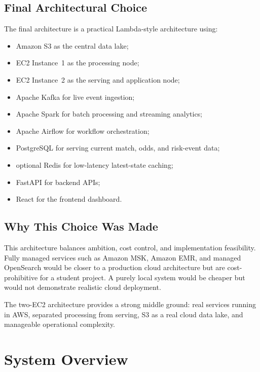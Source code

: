 \documentclass[11pt,a4paper]{article}
\begin{document}
\subsection{Final Architectural Choice}

The final architecture is a practical Lambda-style architecture using:

\begin{itemize}[nosep]
  \item Amazon S3 as the central data lake;
  \item EC2 Instance~1 as the processing node;
  \item EC2 Instance~2 as the serving and application node;
  \item Apache Kafka for live event ingestion;
  \item Apache Spark for batch processing and streaming analytics;
  \item Apache Airflow for workflow orchestration;
  \item PostgreSQL for serving current match, odds, and risk-event data;
  \item optional Redis for low-latency latest-state caching;
  \item FastAPI for backend APIs;
  \item React for the frontend dashboard.
\end{itemize}

\subsection{Why This Choice Was Made}

This architecture balances ambition, cost control, and implementation feasibility. Fully managed
services such as Amazon MSK, Amazon EMR, and managed OpenSearch would be closer to a production
cloud architecture but are cost-prohibitive for a student project. A purely local system would be
cheaper but would not demonstrate realistic cloud deployment.

The two-EC2 architecture provides a strong middle ground: real services running in AWS, separated
processing from serving, S3 as a real cloud data lake, and manageable operational complexity.

\section{System Overview}
\end{document}
